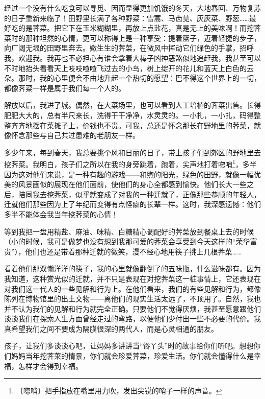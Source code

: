 \documentclass[12pt,UTF-8,openany]{ctexbook}
\begin{document}
\begin{normalsize}
    经过一个没有什么吃食可以寻觅、因而显得更加饥饿的冬天，大地春回、万物复苏的日子重新来临了！田野里长满了各种野菜：雪蒿、马齿苋、灰灰菜、野葱……最好吃的是荠菜。把它下在玉米糊糊里，再放上点盐花，真是无上的美味啊！而挖荠菜时的那种坦然的心情，更可以称得上是一种享受：提着篮子，迈着轻捷的步子，向广阔无垠的田野里奔去。嫩生生的荠菜，在微风中挥动它们绿色的手掌，招呼我，欢迎我。我再也不必担心有谁会拿着大棒子凶神恶煞似地追赶我，我甚至可以不时地抬头看看天上吱吱喳喳飞过去的小鸟，树上绽开的花儿和蓝天上白色的云朵。那时，我的心里便会不由地升起一个热切的愿望：巴不得这个世界上的一切，都像荠菜一样是属于我们每一个人的。
    
    解放以后，我进了城。偶然，在大菜场里，也可以看到人工培植的荠菜出售。长得肥肥大大的，总有半尺来长，洗得干干净净，水灵灵的。一小扎，一小扎，码得整整齐齐地摆在菜摊子上，价钱也不贵。可我，总还是怀念那长在野地里的荠菜，就像怀念那些与自己共过患难的老朋友一样。
    
    多少年来，每到春天，我总要挑个风和日丽的日子，带上孩子们到郊区的野地里去挖荠菜。我明白，孩子们之所以在我的身旁跳着，跑着，尖声地打着唿哨\footnote{〔唿哨〕把手指放在嘴里用力吹，发出尖锐的哨子一样的声音。}，多半因为这对他们来说，是一种有趣的游戏——和煦的阳光，绿色的田野，就像一幅优美的风景画似的展现在他们面前，使他们的身心全都感到愉快。他们长大一些之后，陪同我去挖荠菜，似乎就变成了对我的一种迁就了，正像那些恭顺的年轻人，迁就他们那些因为上了年纪而变得有点怪癖的长辈一样。这时，我深感遗憾：他们多半不能体会我当年挖荠菜的心情！
    
    等到我把一盘用精盐、麻油、味精、白糖精心调配好的荠菜放到餐桌上去的时候（小的时候，我可是做梦也没有想到我那可爱的荠菜会享受到今天这样的“荣华富贵”），他们也还是带着那种迁就的微笑，漫不经心地用筷子挑上几根荠菜……
    
    看着他们那双懒洋洋的筷子，我的心里就像翻倒了的五味瓶，什么滋味都有。因为我知道，这种赏光似的迁就，并不只是表现在对挖荠菜这一桩事情上，它还表现在对我们这一代人的一些见解和行为上。在他们看来，我们的有些见解和行为，都像陈列在博物馆里的出土文物——离他们的现实生活太远了，不顶用了。自然，我也并不认为我们的见解和行为就完全正确。只要他们不觉得厌烦，我甚至愿意跟他们谈谈我们在探索人生方面曾经走过的弯路，以便他们少付出一些不必要的代价。我真希望我们之间不要成为隔膜很深的两代人，而是心灵相通的朋友。
    
    孩子，让我们多谈谈心吧，让妈妈多讲讲当“馋丫头”时的故事给你们听吧。想想你们妈妈当年挖荠莱的情景，你们就会珍爱荠菜，珍爱生活。你们就会懂得什么是幸福，怎样才会得到幸福。
    
\end{normalsize}
\end{document}

